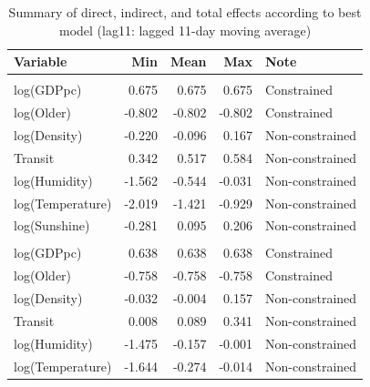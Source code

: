 \documentclass[]{elsarticle} %
\begin{document}
\begin{table}

\caption{\label{tab:summary-impacts-best-model}\label{tab:summary-impacts-best-model}Summary of direct, indirect, and total effects according to best model (lag11: lagged 11-day moving average)}
\centering
\begin{tabular}[t]{lrrrl}
\toprule
Variable & Min & Mean & Max & Note\\
\midrule
\rowcolor{gray!6}  \addlinespace[0.3em]
\multicolumn{5}{l}{\textbf{Direct Effects}}\\
\hspace{1em}log(GDPpc) & 0.675 & 0.675 & 0.675 & Constrained\\
\hspace{1em}log(Older) & -0.802 & -0.802 & -0.802 & Constrained\\
\rowcolor{gray!6}  \hspace{1em}log(Density) & -0.220 & -0.096 & 0.167 & Non-constrained\\
\hspace{1em}Transit & 0.342 & 0.517 & 0.584 & Non-constrained\\
\rowcolor{gray!6}  \hspace{1em}log(Humidity) & -1.562 & -0.544 & -0.031 & Non-constrained\\
\hspace{1em}log(Temperature) & -2.019 & -1.421 & -0.929 & Non-constrained\\
\rowcolor{gray!6}  \hspace{1em}log(Sunshine) & -0.281 & 0.095 & 0.206 & Non-constrained\\
\addlinespace[0.3em]
\multicolumn{5}{l}{\textbf{Indirect Effects}}\\
\hspace{1em}log(GDPpc) & 0.638 & 0.638 & 0.638 & Constrained\\
\rowcolor{gray!6}  \hspace{1em}log(Older) & -0.758 & -0.758 & -0.758 & Constrained\\
\hspace{1em}log(Density) & -0.032 & -0.004 & 0.157 & Non-constrained\\
\rowcolor{gray!6}  \hspace{1em}Transit & 0.008 & 0.089 & 0.341 & Non-constrained\\
\hspace{1em}log(Humidity) & -1.475 & -0.157 & -0.001 & Non-constrained\\
\rowcolor{gray!6}  \hspace{1em}log(Temperature) & -1.644 & -0.274 & -0.014 & Non-constrained\\

\end{tabular}
\end{table}
\end{document}

